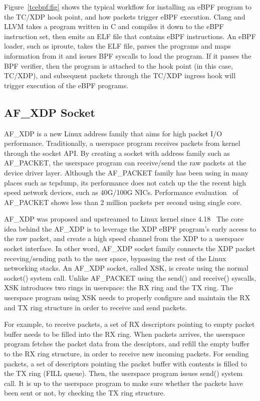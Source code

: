 \documentclass[10pt]{sigplanconf}
\begin{document}
Figure~\ref{tcebpf:fig}
shows the typical workflow for installing an eBPF program to the TC/XDP hook point,
and how packets trigger eBPF execution.  Clang and LLVM takes a program
written in C and compiles it down to the eBPF instruction set, then emits an
ELF file that contains eBPF instructions.  An eBPF loader, such as iproute,
takes the ELF file, parses the programs and maps information from it and
issues BPF syscalls to load the program.  If it passes the BPF verifier,
then the program is attached to the hook point (in this case, TC/XDP), and
subsequent packets through the TC/XDP ingress hook will trigger execution of the
eBPF programs.

\subsection{AF\_XDP Socket}
AF\_XDP is a new Linux address family that aims for high packet I/O
performance. Traditionally, a userspace program receives packets from
kernel through the socket API.  By creating a socket with address family
such as AF\_PACKET, the userspace program can receive/send the raw packets
at the device driver layer.  Although the AF\_PACKET family has been using
in many places such as tcpdump, its performance does not catch up the the
recent high speed network devices, such as 40G/100G NICs.
Performance evaluation~\cite{danialafpacket,johnafxdp} of AF\_PACKET
shows less than 2 million packets per second using single core.

AF\_XDP was proposed and upstreamed to Linux kernel since 4.18~\cite{afxdp} 
The core idea behind the AF\_XDP is to leverage the XDP eBPF program's
early access to the raw packet, and create a high speed channel from the XDP to
a userspace socket interface. In other word, AF\_XDP socket family connects the
XDP packet receving/sending path to the user space, bypassing the rest of the
Linux networking stacks.
An AF\_XDP socket, called XSK, is create using the normal socket() system
call. Unlike AF\_PACKET using the send() and receive() syscalls,
XSK introduces two rings in userspace: the RX ring and the TX ring.
The userspace program using XSK needs to properly configure and maintain
the RX and TX ring structure in order to receive and send packets.

For example, to receive packets, a set of RX descriptors pointing to empty
packet buffer needs to be filled into the RX ring.  When packets arrives,
the userspace program fetches the packet data from the desciptors, and
refill the empty buffer to the RX ring structure, in order to receive new
incoming packets.  For sending packets, a set of descriptors pointing the
packet buffer with contents is filled to the TX ring (FILL queue).
Then, the userspace
program issues send() system call.  It is up to the userspace program to
make sure whether the packets have been sent or not, by checking the TX
ring structure.
\end{document}
